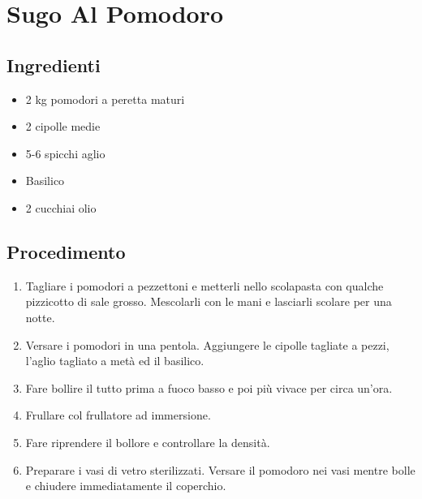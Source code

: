 \section{Sugo Al Pomodoro}
\subsection{Ingredienti}
\begin{itemize}
\item 2 kg pomodori a peretta maturi  
\item 2 cipolle medie  
\item 5-6 spicchi aglio  
\item Basilico  
\item 2 cucchiai olio
\end{itemize}
\subsection{Procedimento}
\begin{enumerate}
\item  Tagliare i pomodori a pezzettoni e metterli nello scolapasta con qualche pizzicotto di sale grosso. Mescolarli con le mani e lasciarli scolare per una notte.  
\item  Versare i pomodori in una pentola. Aggiungere le cipolle tagliate a pezzi, l'aglio tagliato a metà ed il basilico.  
\item  Fare bollire il tutto prima a fuoco basso e poi più vivace per circa un'ora.  
\item  Frullare col frullatore ad immersione.  
\item  Fare riprendere il bollore e controllare la densità.  
\item  Preparare i vasi di vetro sterilizzati. Versare il pomodoro nei vasi mentre bolle e chiudere immediatamente il coperchio.
\end{enumerate}
